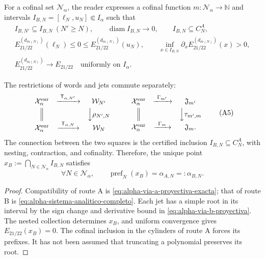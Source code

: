 For a cofinal set \(\mathcal N_\alpha\), the reader expresses a cofinal
function \(m:\mathcal N_\alpha\to\mathbb N\) and intervals
\(I_{B,N}=[\ell_N,u_N]\Subset I_\alpha\) such that
\begin{equation}
\begin{gathered}
 I_{B,N'}\subseteq I_{B,N}\ (N'\ge N),\qquad
 \operatorname{diam}I_{B,N}\longrightarrow0,\qquad
 I_{B,N}\subseteq C_N^A,\\
 E_{21/22}^{(d_{m(N)})}(\ell_N)\le0\le
 E_{21/22}^{(d_{m(N)})}(u_N),\qquad
 \inf_{x\in I_{B,N}}\partial_xE_{21/22}^{(d_{m(N)})}(x)>0,\\
 E_{21/22}^{(d_{m(N)})}\longrightarrow E_{21/22}
 \quad\text{uniformly on }I_\alpha .
\end{gathered}
 \tag{A4}
 \label{eq:alpha-via-b-proyectiva}
\end{equation}

\begin{proposition}
\label{prop:alpha-cuadrados-compatibilidad}
The restrictions of words and jets commute separately:
\[
\begin{array}{ccc}
 \mathcal X_\alpha^{\mathrm{enr}}&
 \xrightarrow{\ \mathsf T_{\alpha,N'}\ }&\mathcal W_{N'}\\[1mm]
 \Big\Vert&&\Big\downarrow\rho_{N',N}\\[1mm]
 \mathcal X_\alpha^{\mathrm{enr}}&
 \xrightarrow{\ \mathsf T_{\alpha,N}\ }&\mathcal W_N
\end{array}
\qquad
\begin{array}{ccc}
 \mathcal X_\alpha^{\mathrm{enr}}&
 \xrightarrow{\ \Gamma_{m'}\ }&\mathfrak J_{m'}\\[1mm]
 \Big\Vert&&\Big\downarrow\tau_{m',m}\\[1mm]
 \mathcal X_\alpha^{\mathrm{enr}}&
 \xrightarrow{\ \Gamma_m\ }&\mathfrak J_m .
\end{array}
 \tag{A5}
\]
The connection between the two squares is the certified inclusion
\(I_{B,N}\subseteq C_N^A\), with nesting, contraction, and cofinality.
Therefore, the unique point
\(x_B:=\bigcap_{N\in\mathcal N_\alpha}I_{B,N}\) satisfies
\begin{equation}
 \forall N\in\mathcal N_\alpha,\qquad
 \operatorname{pref}_N(x_B)=\alpha_{A,N}=:\alpha_{B,N}.
 \tag{A6}
 \label{eq:alpha-igualdad-cada-nivel}
\end{equation}
\end{proposition}

\begin{proof}
Compatibility of route A is
\eqref{eq:alpha-via-a-proyectiva-exacta}; that of route B is
\eqref{eq:alpha-sistema-analitico-completo}. Each jet has a simple root in
its interval by the sign change and derivative bound in
\eqref{eq:alpha-via-b-proyectiva}. The nested collection determines \(x_B\), and
uniform convergence gives \(E_{21/22}(x_B)=0\). The cofinal inclusion in the
cylinders of route A forces its prefixes. It has not been assumed that
truncating a polynomial preserves its root.
\end{proof}

